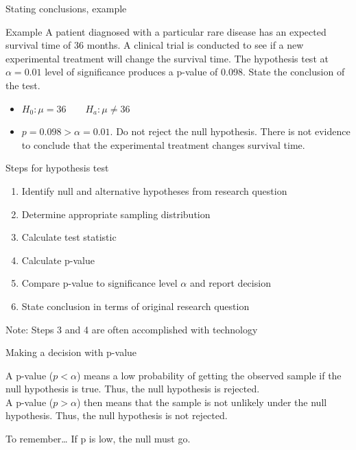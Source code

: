 \documentclass[xcolor=table, aspectratio=169, bigger]{beamer}
\begin{document}
\begin{frame}{Stating conclusions, example}
\begin{exampleblock}{Example}
A patient diagnosed with a particular rare disease has an expected survival time of 36 months. A clinical trial is conducted to see if a new experimental treatment will change the survival time. The hypothesis test at $\alpha = 0.01$ level of significance produces a p-value of 0.098. State the conclusion of the test.
\begin{itemize}
\pause\item $H_0: \mu = 36 \qquad H_a: \mu \ne 36$
\pause\item $p=0.098 > \alpha = 0.01$. Do not reject the null hypothesis. There is not evidence to conclude that the experimental treatment changes survival time.
\end{itemize}\end{exampleblock}
\end{frame}

\begin{frame}{Steps for hypothesis test}
\begin{block}{}
\begin{enumerate}
\item Identify null and alternative hypotheses from research question
\item Determine appropriate sampling distribution
\item Calculate test statistic
\item Calculate p-value
\item Compare p-value to significance level $\alpha$ and report decision
\item State conclusion in terms of original research question
\end{enumerate}
Note: Steps 3 and 4 are often accomplished with technology
\end{block}
\end{frame}

\begin{frame}{Making a decision with p-value}
\begin{block}{}
A  p-value ($p < \alpha$) means a low probability of getting the observed sample if the null hypothesis is true. Thus, the null hypothesis is rejected.\\
\medskip
A  p-value ($p > \alpha$) then means that the sample is not unlikely under the null hypothesis. Thus, the null hypothesis is not rejected.
\end{block}

\pause
\begin{alertblock}{To remember\ldots}
\large If p is low, the null must go.
\end{alertblock}

\end{frame}
\end{document}
